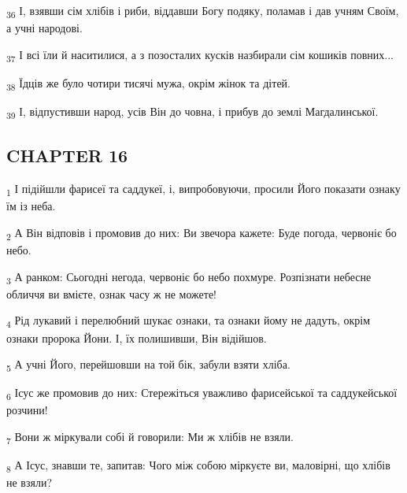\begin{tcolorbox}
\textsubscript{36} І, взявши сім хлібів і риби, віддавши Богу подяку, поламав і дав учням Своїм, а учні народові.
\end{tcolorbox}
\begin{tcolorbox}
\textsubscript{37} І всі їли й наситилися, а з позосталих кусків назбирали сім кошиків повних...
\end{tcolorbox}
\begin{tcolorbox}
\textsubscript{38} Їдців же було чотири тисячі мужа, окрім жінок та дітей.
\end{tcolorbox}
\begin{tcolorbox}
\textsubscript{39} І, відпустивши народ, усів Він до човна, і прибув до землі Магдалинської.
\end{tcolorbox}
\subsection{CHAPTER 16}
\begin{tcolorbox}
\textsubscript{1} І підійшли фарисеї та саддукеї, і, випробовуючи, просили Його показати ознаку їм із неба.
\end{tcolorbox}
\begin{tcolorbox}
\textsubscript{2} А Він відповів і промовив до них: Ви звечора кажете: Буде погода, червоніє бо небо.
\end{tcolorbox}
\begin{tcolorbox}
\textsubscript{3} А ранком: Сьогодні негода, червоніє бо небо похмуре. Розпізнати небесне обличчя ви вмієте, ознак часу ж не можете!
\end{tcolorbox}
\begin{tcolorbox}
\textsubscript{4} Рід лукавий і перелюбний шукає ознаки, та ознаки йому не дадуть, окрім ознаки пророка Йони. І, їх полишивши, Він відійшов.
\end{tcolorbox}
\begin{tcolorbox}
\textsubscript{5} А учні Його, перейшовши на той бік, забули взяти хліба.
\end{tcolorbox}
\begin{tcolorbox}
\textsubscript{6} Ісус же промовив до них: Стережіться уважливо фарисейської та саддукейської розчини!
\end{tcolorbox}
\begin{tcolorbox}
\textsubscript{7} Вони ж міркували собі й говорили: Ми ж хлібів не взяли.
\end{tcolorbox}
\begin{tcolorbox}
\textsubscript{8} А Ісус, знавши те, запитав: Чого між собою міркуєте ви, маловірні, що хлібів не взяли?
\end{tcolorbox}
